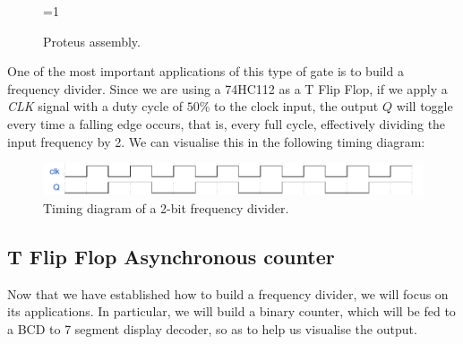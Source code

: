 \begin{figure}[H]
    \centering
    
    \ifnum\value{ANIMATION}=1 {
    } 
    \fi
    
    \caption{Proteus assembly.}
    \label{fig:PROTEUS_T}
\end{figure}

\clearpage

One of the most important applications of this type of gate is to build a frequency divider. Since we are using a 74HC112 as a T Flip Flop, if we apply a \textit{CLK} signal with a duty cycle of $50\%$ to the clock input, the output $Q$ will toggle every time a falling edge occurs, that is, every full cycle, effectively dividing the input frequency by 2. We can visualise this in the following timing diagram: \medskip

\begin{figure}[H]
    \centering
    \includegraphics[scale = 0.73]{Graphics/Practice 2/GRAPHICS/TIMING/EX2.pdf}
    \caption{Timing diagram of a 2-bit frequency divider.}
    \label{fig:timing_1}
\end{figure}

\subsection{T Flip Flop Asynchronous counter}

Now that we have established how to build a frequency divider, we will focus on its applications. In particular, we will build a binary counter, which will be fed to a BCD to 7 segment display decoder, so as to help us visualise the output.\medskip

